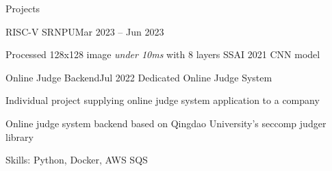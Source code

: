 \documentclass{resume}
\begin{document}
\begin{rSection}{Projects}
\begin{rSubsection}{RISC-V SRNPU}{Mar 2023 -- Jun 2023}
        \item Processed 128x128 image \emph{under 10ms} with 8 layers SSAI 2021 CNN model
    \end{rSubsection}

    \begin{rSubsection}{Online Judge Backend}{Jul 2022}
        Dedicated Online Judge System

        \item Individual project supplying online judge system application to a company

        \item Online judge system backend based on Qingdao University's seccomp judger library

        \item Skills: Python, Docker, AWS SQS
    \end{rSubsection}
    
\end{rSection}
\end{document}
